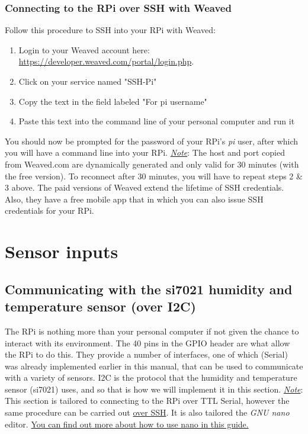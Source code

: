 \documentclass{article}
\newcommand{\note}[1]{\underline{\textit{Note}}: #1}
\begin{document}
    \subsubsection{Connecting to the RPi over SSH with Weaved}
    Follow this procedure to SSH into your RPi with Weaved:
    \begin{enumerate}
      \item Login to your Weaved account here: \href{https://developer.weaved.com/portal/login.php}{https://developer.weaved.com/portal/login.php}.
      \item Click on your service named "SSH-Pi"
      \item Copy the text in the field labeled "For pi username"
      \item Paste this text into the command line of your personal computer and run it
    \end{enumerate}
    You should now be prompted for the password of your RPi's \textit{pi} user, after which you will have a command line into your RPi.
    \note{The host and port copied from Weaved.com are dynamically generated and only valid for 30 minutes (with the free version). To reconnect after 30 minutes, you will have to repeat steps 2 \& 3 above. The paid versions of Weaved extend the lifetime of SSH credentials. Also, they have a free mobile app that in which you can also issue SSH credentials for your RPi.}

\section{Sensor inputs}
    \subsection{Communicating with the si7021 humidity and temperature sensor (over I2C)}
  The RPi is nothing more than your personal computer if not given the chance to interact with its environment. The 40 pins in the GPIO header are what allow the RPi to do this. They provide a number of interfaces, one of which (Serial) was already implemented earlier in this manual, that can be used to communicate with a variety of sensors. I2C is the protocol that the humidity and temperature sensor (si7021) uses, and so that is how we will implement it in this section.
  \newline\newline\underline{\textit{Note}}: This section is tailored to connecting to the RPi over TTL Serial, however the same procedure can be carried out \hyperref[sec:connect-ssh]{over SSH}. It is also tailored the \textit{GNU nano} editor. \href{http://www.howtogeek.com/howto/42980/the-beginners-guide-to-nano-the-linux-command-line-text-editor/}{You can find out more about how to use nano in this guide.}
\end{document}
